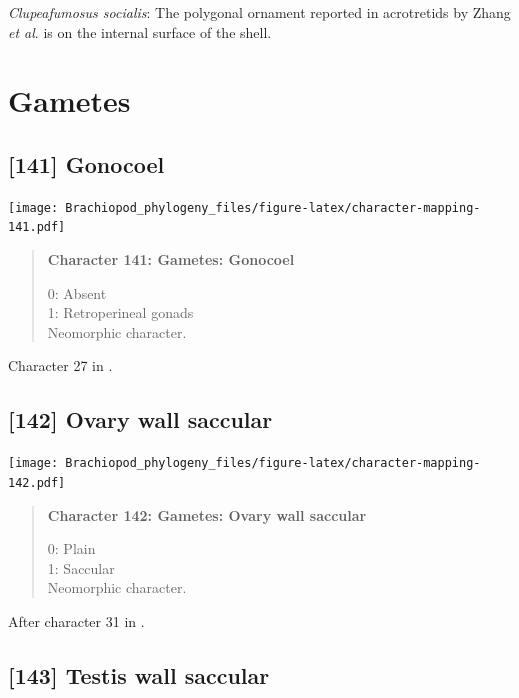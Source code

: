 \documentclass[openany]{book}
\begin{document}
\hypertarget{Clupeafumosus_socialis-coding-140}{}
\emph{Clupeafumosus socialis}: The polygonal ornament reported in
acrotretids by Zhang \emph{et al}. \citeyearpar{Zhang2016Epithelialcell}
is on the internal surface of the shell.

\section{Gametes}\label{gametes}

\subsection*{{[}141{]} Gonocoel}\label{gonocoel}

\texttt{[image: Brachiopod\_phylogeny\_files/figure-latex/character-mapping-141.pdf]}

\begin{quote}
\textbf{Character 141: Gametes: Gonocoel}

0: Absent\\
1: Retroperineal gonads\\
Neomorphic character.
\end{quote}

Character 27 in \citet{Haszprunar1996}.

\subsection*{{[}142{]} Ovary wall saccular}\label{ovary-wall-saccular}

\texttt{[image: Brachiopod\_phylogeny\_files/figure-latex/character-mapping-142.pdf]}

\begin{quote}
\textbf{Character 142: Gametes: Ovary wall saccular}

0: Plain\\
1: Saccular\\
Neomorphic character.
\end{quote}

After character 31 in \citet{Haszprunar1996}.

\subsection*{{[}143{]} Testis wall saccular}\label{testis-wall-saccular}
\end{document}
